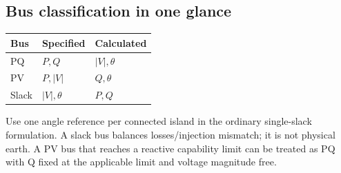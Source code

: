 \documentclass[11pt,a4paper]{article}
\begin{document}
\subsection{Bus classification in one glance}
\begin{center}\begin{tabularx}{\textwidth}{L{.22\textwidth}Y Y}
\toprule Bus & Specified & Calculated\\\midrule
PQ & $P,Q$ & $|V|,\theta$\\
PV & $P,|V|$ & $Q,\theta$\\
Slack & $|V|,\theta$ & $P,Q$\\\bottomrule
\end{tabularx}\end{center}
Use one angle reference per connected island in the ordinary single-slack formulation. A slack bus balances losses/injection mismatch; it is not physical earth. A PV bus that reaches a reactive capability limit can be treated as PQ with Q fixed at the applicable limit and voltage magnitude free.
\end{document}
